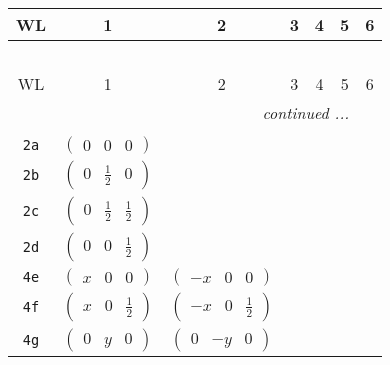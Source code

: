 \documentclass[fleqn,9pt,landscape]{jsarticle}
\begin{document}
\begin{center}
\renewcommand{\arraystretch}{1.2}
\begin{longtable}{ccccccc}
 \hline \hline
WL & 1 & 2 & 3 & 4 & 5 & 6 \\ \hline \endfirsthead

\multicolumn{6}{l}{\tablename\ \thetable{}} \\
 \hline \hline
WL & 1 & 2 & 3 & 4 & 5 & 6 \\ \hline \endhead

 \hline \hline
\multicolumn{6}{r}{\footnotesize\it continued ...} \\ \endfoot

 \hline \hline
\multicolumn{6}{r}{} \\ \endlastfoot

{\tt 2a} & $ \begin{pmatrix} 0 & 0 & 0 \end{pmatrix} $ & $  $ & $  $ & $  $ \\ \hline
{\tt 2b} & $ \begin{pmatrix} 0 & \frac{1}{2} & 0 \end{pmatrix} $ & $  $ & $  $ & $  $ \\ \hline
{\tt 2c} & $ \begin{pmatrix} 0 & \frac{1}{2} & \frac{1}{2} \end{pmatrix} $ & $  $ & $  $ & $  $ \\ \hline
{\tt 2d} & $ \begin{pmatrix} 0 & 0 & \frac{1}{2} \end{pmatrix} $ & $  $ & $  $ & $  $ \\ \hline
{\tt 4e} & $ \begin{pmatrix} x & 0 & 0 \end{pmatrix} $ & $ \begin{pmatrix} - x & 0 & 0 \end{pmatrix} $ & $  $ & $  $ \\ \hline
{\tt 4f} & $ \begin{pmatrix} x & 0 & \frac{1}{2} \end{pmatrix} $ & $ \begin{pmatrix} - x & 0 & \frac{1}{2} \end{pmatrix} $ & $  $ & $  $ \\ \hline
{\tt 4g} & $ \begin{pmatrix} 0 & y & 0 \end{pmatrix} $ & $ \begin{pmatrix} 0 & - y & 0 \end{pmatrix} $ & $  $ & $  $ \\ \hline

\end{longtable}
\end{center}
\end{document}

